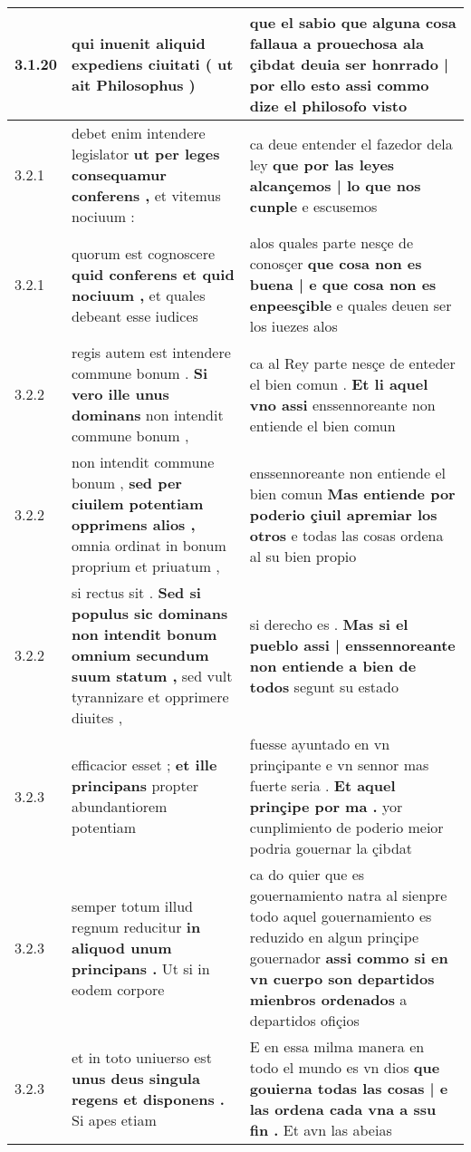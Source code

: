 \begin{tabular}{|p{1cm}|p{6.5cm}|p{6.5cm}|}
3.1.20 & qui inuenit \textbf{ aliquid expediens ciuitati } ( ut ait Philosophus ) & que el sabio \textbf{ que alguna cosa fallaua a prouechosa ala çibdat deuia ser honrrado | por ello esto } assi commo dize el philosofo visto \\\hline
3.2.1 & debet enim intendere legislator \textbf{ ut per leges consequamur conferens , } et vitemus nociuum : & ca deue entender el fazedor dela ley \textbf{ que por las leyes alcançemos | lo que nos cunple } e escusemos \\\hline
3.2.1 & quorum est cognoscere \textbf{ quid conferens et quid nociuum , } et quales debeant esse iudices & alos quales parte nesçe de conosçer \textbf{ que cosa non es buena | e que cosa non es enpeesçible } e quales deuen ser los iuezes alos \\\hline
3.2.2 & regis autem est intendere commune bonum . \textbf{ Si vero ille unus dominans } non intendit commune bonum , & ca al Rey parte nesçe de enteder el bien comun . \textbf{ Et li aquel vno assi } enssennoreante non entiende el bien comun \\\hline
3.2.2 & non intendit commune bonum , \textbf{ sed per ciuilem potentiam opprimens alios , } omnia ordinat in bonum proprium et priuatum , & enssennoreante non entiende el bien comun \textbf{ Mas entiende por poderio çiuil apremiar los otros } e todas las cosas ordena al su bien propio \\\hline
3.2.2 & si rectus sit . \textbf{ Sed si populus sic dominans non intendit bonum omnium secundum suum statum , } sed vult tyrannizare et opprimere diuites , & si derecho es . \textbf{ Mas si el pueblo assi | enssennoreante non entiende a bien de todos } segunt su estado \\\hline
3.2.3 & efficacior esset ; \textbf{ et ille principans } propter abundantiorem potentiam & fuesse ayuntado en vn prinçipante e vn sennor mas fuerte seria . \textbf{ Et aquel prinçipe por ma . } yor cunplimiento de poderio meior podria gouernar la çibdat \\\hline
3.2.3 & semper totum illud regnum reducitur \textbf{ in aliquod unum principans . } Ut si in eodem corpore & ca do quier que es gouernamiento natra al sienpre todo aquel gouernamiento es reduzido en algun prinçipe gouernador \textbf{ assi commo si en vn cuerpo son departidos mienbros ordenados } a departidos ofiçios \\\hline
3.2.3 & et in toto uniuerso est \textbf{ unus deus singula regens et disponens . } Si apes etiam & E en essa milma manera en todo el mundo es vn dios \textbf{ que gouierna todas las cosas | e las ordena cada vna a ssu fin . } Et avn las abeias \\\hline

\end{tabular}
